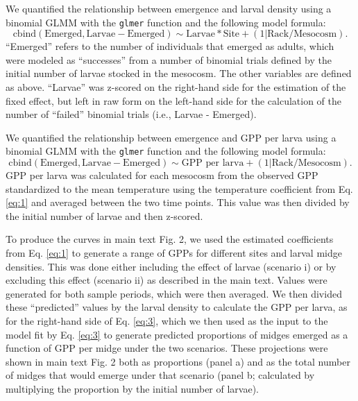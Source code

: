 \documentclass[12pt]{article}
\begin{document}
We quantified the relationship between emergence and larval density
using a binomial GLMM with the \texttt{glmer} function and the following model formula: 
%
\begin{equation} \label{eq:2}
\text{cbind}(\text{Emerged}, \text{Larvae} - \text{Emerged}) \sim \text{Larvae}*\text{Site} + 
        (1|\text{Rack}/\text{Mesocosm}).
\end{equation}
%
``Emerged'' refers to the number of individuals that emerged as adults,
which were modeled as ``successes'' from a number of binomial trials defined 
by the initial number of larvae stocked in the mesocosm.
The other variables are defined as above. 
``Larvae'' was z-scored on the right-hand side for the estimation
of the fixed effect, but left in raw form on the left-hand side 
for the calculation of the number of ``failed'' binomial trials (i.e., Larvae - Emerged).

We quantified the relationship between emergence and GPP per larva
using a binomial GLMM with the \texttt{glmer} function and the following model formula: 
%
\begin{equation} \label{eq:3}
\text{cbind}(\text{Emerged}, \text{Larvae} - \text{Emerged}) \sim \text{GPP per larva}  + 
          (1|\text{Rack}/\text{Mesocosm}).
\end{equation}
%
GPP per larva was calculated for each mesocosm from the observed GPP standardized to the mean
temperature using the temperature coefficient from Eq. \ref{eq:1}
and averaged between the two time points.
This value was then divided by the initial number of larvae and then z-scored.

To produce the curves in main text Fig. 2,
we used the estimated coefficients from Eq. \ref{eq:1} to generate a range of GPPs for different 
sites and larval midge densities.
This was done either including the effect of larvae (scenario i) 
or by excluding this effect (scenario ii) as described in the main text.
Values were generated for both sample periods, which were then averaged.
We then divided these ``predicted'' values by the larval density to calculate 
the GPP per larva, as for the right-hand side of Eq. \ref{eq:3},
which we then used as the input to the model fit by Eq. \ref{eq:3} to generate
predicted proportions of midges emerged as a function of GPP per midge
under the two scenarios.
These projections were shown in main text Fig. 2 both as proportions (panel a)
and as the total number of midges that would emerge under that scenario 
(panel b; calculated by multiplying the proportion by the initial number of larvae).

\clearpage





\clearpage
\end{document}
